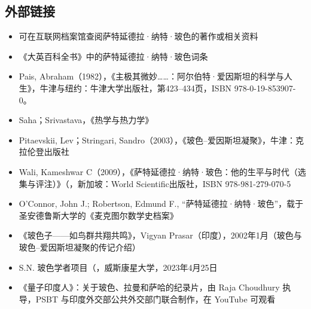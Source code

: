 \subsection{外部链接}
\begin{itemize}
\item 可在互联网档案馆查阅萨特延德拉·纳特·玻色的著作或相关资料
\item 《大英百科全书》中的萨特延德拉·纳特·玻色词条
\item Pais, Abraham（1982），《主极其微妙……：阿尔伯特·爱因斯坦的科学与人生》，牛津与纽约：牛津大学出版社，第423–434页，ISBN 978-0-19-853907-0。
\item Saha；Srivastava，《热学与热力学》
\item Pitaevskii, Lev；Stringari, Sandro（2003），《玻色–爱因斯坦凝聚》，牛津：克拉伦登出版社
\item Wali, Kameshwar C（2009），《萨特延德拉·纳特·玻色：他的生平与时代（选集与评注）》（，新加坡：World Scientific出版社，ISBN 978-981-279-070-5
\item O'Connor, John J.; Robertson, Edmund F., “萨特延德拉·纳特·玻色”，载于圣安德鲁斯大学的《麦克图尔数学史档案》
\item 《玻色子——如鸟群共翔共鸣》，Vigyan Prasar（印度），2002年1月（玻色与玻色–爱因斯坦凝聚的传记介绍）
\item S.N. 玻色学者项目（，威斯康星大学，2023年4月25日
\item 《量子印度人》：关于玻色、拉曼和萨哈的纪录片，由 Raja Choudhury 执导，PSBT 与印度外交部公共外交部门联合制作，在 YouTube 可观看
\end{itemize}